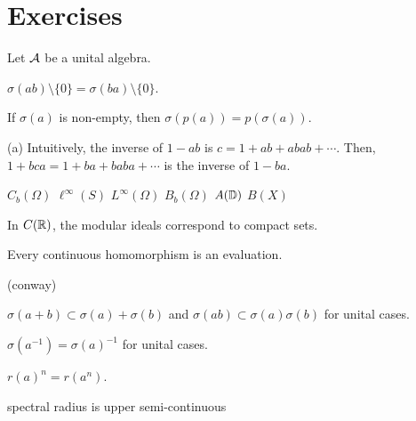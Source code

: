 \documentclass{../note}
\begin{document}
\section*{Exercises}
\begin{prb}
Let $\mathcal{A}$ be a unital algebra.
\begin{parts}
\item $\sigma(ab)\setminus\{0\}=\sigma(ba)\setminus\{0\}$.
\item If $\sigma(a)$ is non-empty, then $\sigma(p(a))=p(\sigma(a))$.
\end{parts}
\end{prb}
\begin{pf}
(a)
Intuitively, the inverse of $1-ab$ is $c=1+ab+abab+\cdots$.
Then, $1+bca=1+ba+baba+\cdots$ is the inverse of $1-ba$.
\end{pf}

$C_b(\Omega)$ $\ell^\infty(S)$ $L^\infty(\Omega)$ $B_b(\Omega)$ $A(\mathbb{D})$
$B(X)$

\begin{prb}
In $C(\mathbb{R})$, the modular ideals correspond to compact sets.
\end{prb}

\begin{prb}
\begin{parts}
\item Every continuous homomorphism is an evaluation.
\end{parts}
\end{prb}

\begin{prb}
(conway)
\end{prb}

\begin{prb}
\begin{parts}
\item $\sigma(a+b)\subset\sigma(a)+\sigma(b)$ and $\sigma(ab)\subset\sigma(a)\sigma(b)$ for unital cases.
\item $\sigma(a^{-1})=\sigma(a)^{-1}$ for unital cases.
\item $r(a)^n=r(a^n)$.
\end{parts}
\end{prb}

spectral radius is upper semi-continuous
\end{document}
